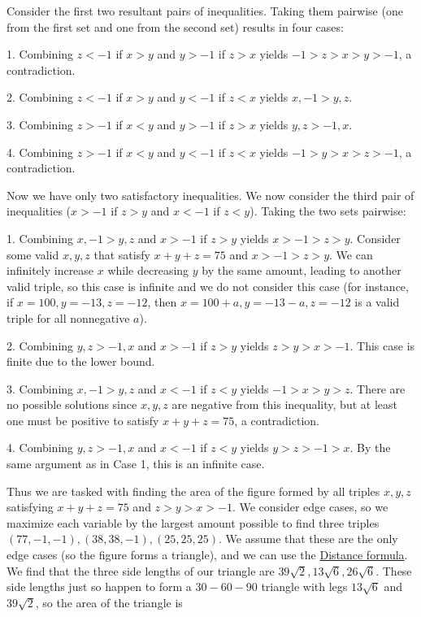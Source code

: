 \begin{enumerate}
 
Consider the first two resultant pairs of inequalities. Taking them pairwise (one from the first set and one from the second set) results in four cases:

 
1. Combining $z<-1$ if $x>y$ and $y>-1$ if $z>x$ yields $-1>z>x>y>-1$, a contradiction.

 2. Combining $z<-1$ if $x>y$ and $y<-1$ if $z<x$ yields $x,-1>y,z$.

 3. Combining $z>-1$ if $x<y$ and $y>-1$ if $z>x$ yields $y,z>-1,x$.

 4. Combining $z>-1$ if $x<y$ and $y<-1$ if $z<x$ yields $-1>y>x>z>-1$, a contradiction.

 
Now we have only two satisfactory inequalities. We now consider the third pair of inequalities ($x>-1$ if $z>y$ and $x<-1$ if $z<y$). Taking the two sets pairwise:

 
1. Combining $x,-1>y,z$ and $x>-1$ if $z>y$ yields $x>-1>z>y$. Consider some valid $x,y,z$ that satisfy $x+y+z=75$ and $x>-1>z>y$. We can infinitely increase $x$ while decreasing $y$ by the same amount, leading to another valid triple, so this case is infinite and we do not consider this case (for instance, if $x=100,y=-13,z=-12$, then $x=100+a,y=-13-a,z=-12$ is a valid triple for all nonnegative $a$).

 2. Combining $y,z>-1,x$ and $x>-1$ if $z>y$ yields $z>y>x>-1$. This case is finite due to the lower bound.

 3. Combining $x,-1>y,z$ and $x<-1$ if $z<y$ yields $-1>x>y>z$. There are no possible solutions since $x,y,z$ are negative from this inequality, but at least one must be positive to satisfy $x+y+z=75$, a contradiction.

 4. Combining $y,z>-1,x$ and $x<-1$ if $z<y$ yields $y>z>-1>x$. By the same argument as in Case 1, this is an infinite case.

 Thus we are tasked with finding the area of the figure formed by all triples $x,y,z$ satisfying $x+y+z=75$ and $z>y>x>-1$. We consider edge cases, so we maximize each variable by the largest amount possible to find three triples $(77,-1,-1),(38,38,-1),(25,25,25)$. We assume that these are the only edge cases (so the figure forms a triangle), and we can use the \href{https://artofproblemsolving.com/wiki/index.php?title=Distance\_formula}{Distance formula}. We find that the three side lengths of our triangle are $39\sqrt{2},13\sqrt{6},26\sqrt{6}$. These side lengths just so happen to form a $30-60-90$ triangle with legs $13\sqrt{6}$ and $39\sqrt{2}$, so the area of the triangle is


\end{enumerate}

